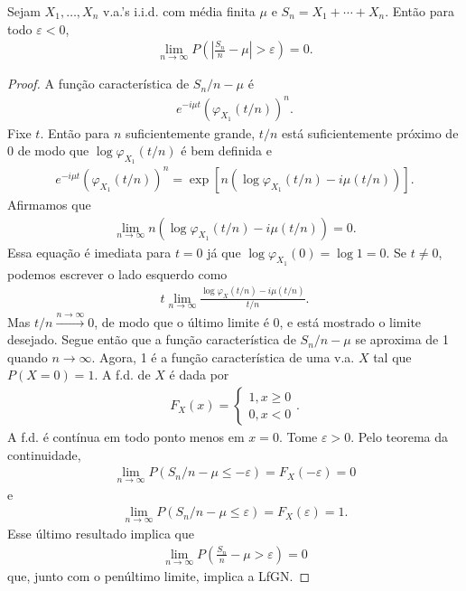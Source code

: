 \documentclass[../Notas.tex]{subfiles}
\begin{document}
\begin{theorem}[LfGN]
Sejam $X_1, \dots, X_n$ v.a.'s i.i.d. com média finita $\mu$ e $S_n = X_1 + \cdots + X_n$. Então para todo $\varepsilon < 0$,
\begin{align*}
    \lim_{n\to\infty} P\left( \left|\frac{S_n}{n} - \mu\right| > \varepsilon \right) = 0.
\end{align*}
\end{theorem}
\begin{proof}
A função característica de $S_n/n - \mu$ é
\begin{align}
    e^{-i\mu t}(\varphi_{X_1}(t/n))^n.
\end{align}
Fixe $t$. Então para $n$ suficientemente grande, $t/n$ está suficientemente próximo de 0 de modo que $\log\varphi_{X_1}(t/n)$ é bem definida e
\begin{align*}
    e^{-i\mu t}(\varphi_{X_1}(t/n))^n = \exp[n(\log\varphi_{X_1}(t/n) - i\mu(t/n))].
\end{align*}
Afirmamos que
\begin{align*}
    \lim_{n\to\infty} n(\log\varphi_{X_1}(t/n) - i\mu(t/n)) = 0.
\end{align*}
Essa equação é imediata para $t=0$ já que $\log\varphi_{X_1}(0) = \log 1 = 0$. Se $t\neq 0$, podemos escrever o lado esquerdo como
\begin{align*}
    t\lim_{n\to\infty} \frac{ \log\varphi_X(t/n) - i\mu(t/n) }{t/n}.
\end{align*}
Mas $t/n\xrightarrow{n\to\infty} 0$, de modo que o último limite é 0, e está mostrado o limite desejado. Segue então que a função característica de $S_n/n - \mu$ se aproxima de 1 quando $n\to\infty$. Agora, 1 é a função característica de uma v.a. $X$ tal que $P(X=0) = 1$. A f.d. de $X$ é dada por
\begin{align*}
    F_X(x) = \begin{cases}
    1, x\geq 0 \\
    0, x < 0
    \end{cases}.
\end{align*}
A f.d. é contínua em todo ponto menos em $x=0$. Tome $\varepsilon > 0$. Pelo teorema da continuidade,
\begin{align*}
    \lim_{n\to\infty} P\left( S_n/n - \mu \leq -\varepsilon \right) = F_X(-\varepsilon) = 0
\end{align*}
e
\begin{align*}
    \lim_{n\to\infty} P\left( S_n/n - \mu \leq \varepsilon \right) = F_X(\varepsilon) = 1.
\end{align*}
Esse último resultado implica que
\begin{align*}
    \lim_{n\to\infty} P\left( \frac{S_n}{n} - \mu > \varepsilon \right) = 0
\end{align*}
que, junto com o penúltimo limite, implica a LfGN.
\end{proof}
\end{document}
